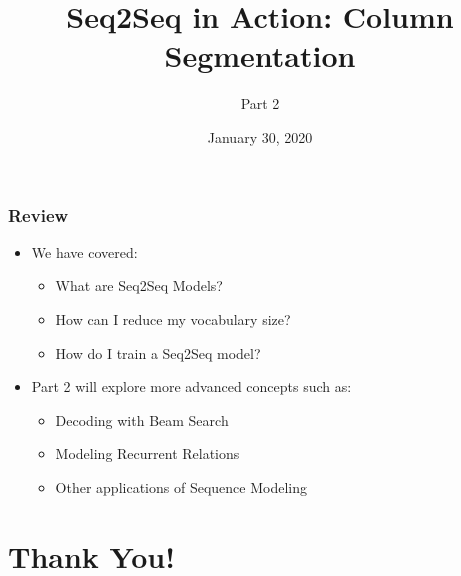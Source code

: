 \documentclass[usenames,dvipsnames]{beamer}
\begin{document}
\begin{frame}
  \frametitle{Review}
  \begin{itemize}
    \item We have covered:
    \begin{itemize}
      \item What are Seq2Seq Models?
      \item How can I reduce my vocabulary size?
      \item How do I train a Seq2Seq model?
    \end{itemize}
    \item Part 2 will explore more advanced concepts such as:
    \begin{itemize}
      \item Decoding with Beam Search
      \item Modeling Recurrent Relations
      \item Other applications of Sequence Modeling
    \end{itemize}
  \end{itemize}
\end{frame}


\section{Thank You!}

\title{Seq2Seq in Action: Column Segmentation}
\subtitle{Part 2}
\date{January 30, 2020}

\begin{frame}
\titlepage
\end{frame}
\end{document}
